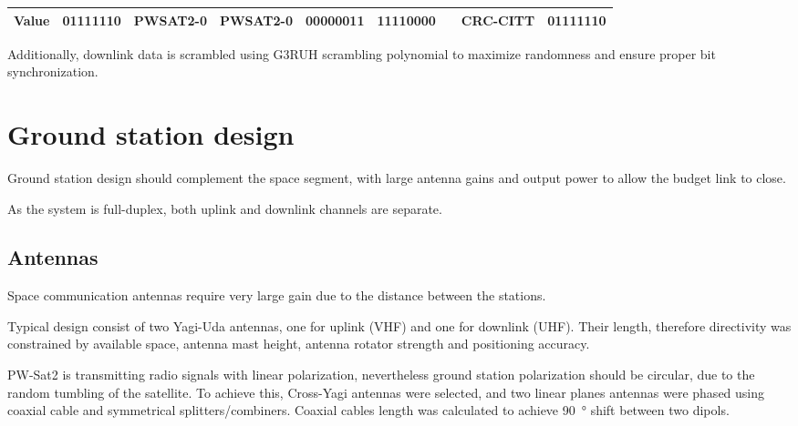 \begin{table}
\begin{tabular}{l|c|c|c|c|c|c|c|c|}
\hline
\multicolumn{1}{|c|}{Value}                                                    & 01111110               & PWSAT2-0                                                     & PWSAT2-0                                                & 00000011                                              & 11110000                                                     & {\cellcolor[rgb]{0.753,0.753,0.753}}                                                                                                                  & CRC-CITT                                                                         & 01111110               \\
\hline
\end{tabular}
\end{table}


Additionally, downlink data is scrambled using G3RUH scrambling polynomial to maximize randomness and ensure proper bit synchronization.


\section{Ground station design}
Ground station design should complement the space segment, with large antenna gains and output power to allow the budget link to close.

As the system is full-duplex, both uplink and downlink channels are separate.

\subsection{Antennas}
Space communication antennas require very large gain due to the distance between the stations. 

Typical design consist of two Yagi-Uda antennas, one for uplink (VHF) and one for downlink (UHF). Their length, therefore directivity was constrained by available space, antenna mast height, antenna rotator strength and positioning accuracy.

PW-Sat2 is transmitting radio signals with linear polarization, nevertheless ground station  polarization should be circular, due to the random tumbling of the satellite. To achieve this, Cross-Yagi antennas were selected, and two linear planes antennas were phased using coaxial cable and symmetrical splitters/combiners. Coaxial cables length was calculated to achieve \SI{90}{\degree} shift between two dipols.

